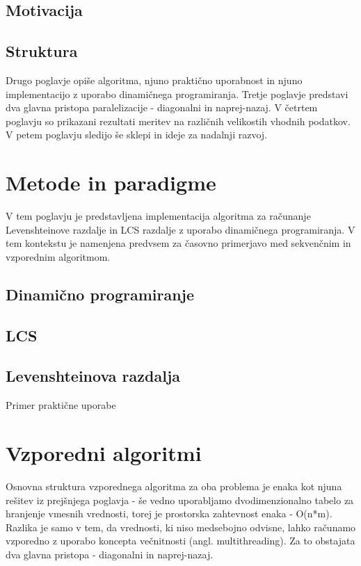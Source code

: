 \documentclass[a4paper,12pt,openright]{book}
\begin{document}
\section{Motivacija}



\section{Struktura}

Drugo poglavje opiše algoritma, njuno praktično uporabnost in njuno implementacijo z uporabo dinamičnega programiranja. Tretje poglavje predstavi dva glavna pristopa paralelizacije - diagonalni in naprej-nazaj. V četrtem poglavju so prikazani rezultati meritev na različnih velikostih vhodnih podatkov. V petem poglavju sledijo še sklepi in ideje za nadalnji razvoj. 

\chapter{Metode in paradigme}

V tem poglavju je predstavljena implementacija algoritma za računanje Levenshteinove razdalje in LCS razdalje z uporabo dinamičnega programiranja. V tem kontekstu je namenjena predvsem za časovno primerjavo med sekvenčnim in vzporednim algoritmom. 

\section{Dinamično programiranje}



\section{LCS}

\section{Levenshteinova razdalja}

Primer praktične uporabe \cite{documentsimilarity}


\chapter{Vzporedni algoritmi}

Osnovna struktura vzporednega algoritma za oba problema je enaka kot njuna rešitev iz prejšnjega poglavja - še vedno uporabljamo dvodimenzionalno tabelo za hranjenje vmesnih vrednosti, torej je prostorska zahtevnost enaka - O(n*m). Razlika je samo v tem, da vrednosti, ki niso medsebojno odvisne, lahko računamo vzporedno z uporabo koncepta večnitnosti (angl. multithreading). Za to obstajata dva glavna pristopa - diagonalni in naprej-nazaj. 
\end{document}
